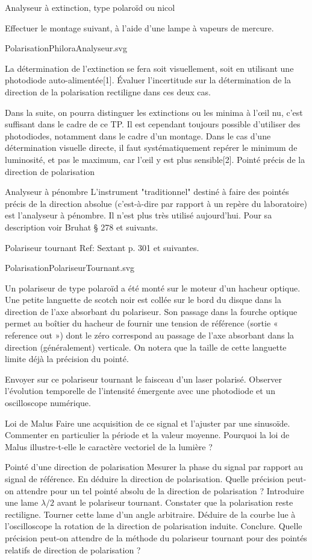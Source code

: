 \documentclass{article}%
\begin{document}
Analyseur à extinction, type polaroïd ou nicol

Effectuer le montage suivant, à l'aide d'une lampe à vapeurs de mercure.


PolarisationPhiloraAnalyseur.svg


La détermination de l'extinction se fera soit visuellement, soit en utilisant une photodiode auto-alimentée[1]. Évaluer l'incertitude sur la détermination de la direction de la polarisation rectiligne dans ces deux cas.

Dans la suite, on pourra distinguer les extinctions ou les minima à l’œil nu, c'est suffisant dans le cadre de ce TP. Il est cependant toujours possible d'utiliser des photodiodes, notamment dans le cadre d'un montage. Dans le cas d'une détermination visuelle directe, il faut systématiquement repérer le minimum de luminosité, et pas le maximum, car l’œil y est plus sensible[2].
Pointé précis de la direction de polarisation

Analyseur à pénombre 
    L'instrument "traditionnel" destiné à faire des pointés précis de la direction absolue (c'est-à-dire par rapport à un repère du laboratoire) est l'analyseur à pénombre. Il n'est plus très utilisé aujourd'hui. Pour sa description voir Bruhat § 278 et suivants.

Polariseur tournant 
    Ref: Sextant p. 301 et suivantes.

PolarisationPolariseurTournant.svg

Un polariseur de type polaroïd a été monté sur le moteur d'un hacheur optique. Une petite languette de scotch noir est collée sur le bord du disque dans la direction de l'axe absorbant du polariseur. Son passage dans la fourche optique permet au boîtier du hacheur de fournir une tension de référence (sortie « reference out ») dont le zéro correspond au passage de l'axe absorbant dans la direction (généralement) verticale. On notera que la taille de cette languette limite déjà la précision du pointé.

Envoyer sur ce polariseur tournant le faisceau d'un laser polarisé. Observer l'évolution temporelle de l'intensité émergente avec une photodiode et un oscilloscope numérique.

Loi de Malus 
    Faire une acquisition de ce signal et l'ajuster par une sinusoïde. Commenter en particulier la période et la valeur moyenne. Pourquoi la loi de Malus illustre-t-elle le caractère vectoriel de la lumière ?

Pointé d'une direction de polarisation 
    Mesurer la phase du signal par rapport au signal de référence. En déduire la direction de polarisation. Quelle précision peut-on attendre pour un tel pointé absolu de la direction de polarisation ? Introduire une lame  $\lambda /2$ avant le polariseur tournant. Constater que la polarisation reste rectiligne. Tourner cette lame d'un angle arbitraire. Déduire de la courbe lue à l'oscilloscope la rotation de la direction de polarisation induite. Conclure. Quelle précision peut-on attendre de la méthode du polariseur tournant pour des pointés relatifs de direction de polarisation ?
\end{document}

